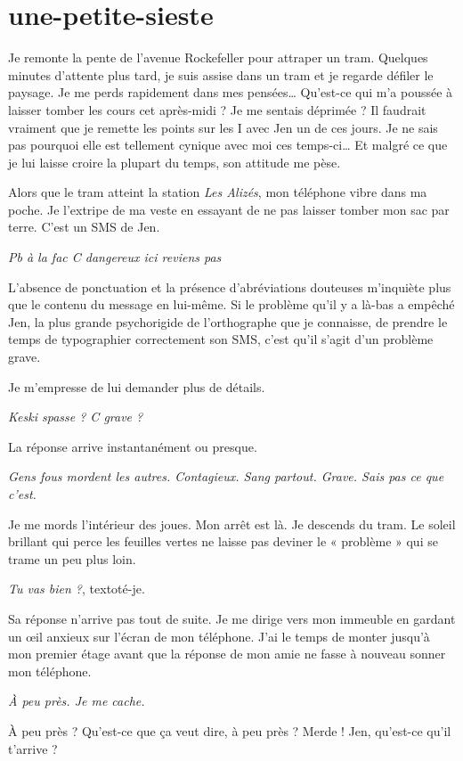 \section{une-petite-sieste}

Je remonte la pente de l'avenue Rockefeller pour attraper un tram. Quelques minutes d'attente plus tard, je suis assise dans un tram et je regarde défiler le paysage. Je me perds rapidement dans mes pensées… Qu'est-ce qui m'a poussée à laisser tomber les cours cet après-midi ? Je me sentais déprimée ? Il faudrait vraiment que je remette les points sur les I avec Jen un de ces jours. Je ne sais pas pourquoi elle est tellement cynique avec moi ces temps-ci… Et malgré ce que je lui laisse croire la plupart du temps, son attitude me pèse.

Alors que le tram atteint la station \textit{Les Alizés}, mon téléphone vibre dans ma poche. Je l'extripe de ma veste en essayant de ne pas laisser tomber mon sac par terre. C'est un SMS de Jen.

\textit{Pb à la fac C dangereux ici reviens pas}

L'absence de ponctuation et la présence d'abréviations douteuses m'inquiète plus que le contenu du message en lui-même. Si le problème qu'il y a là-bas a empêché Jen, la plus grande psychorigide de l'orthographe que je connaisse, de prendre le temps de typographier correctement son SMS, c'est qu'il s'agit d'un problème grave.

Je m'empresse de lui demander plus de détails.

\textit{Keski spasse ? C grave ?}

La réponse arrive instantanément ou presque.

\textit{Gens fous mordent les autres. Contagieux. Sang partout. Grave. Sais pas ce que c'est.}

Je me mords l'intérieur des joues. Mon arrêt est là. Je descends du tram. Le soleil brillant qui perce les feuilles vertes ne laisse pas deviner le « problème » qui se trame un peu plus loin.

\textit{Tu vas bien ?}, textoté-je.

Sa réponse n'arrive pas tout de suite. Je me dirige vers mon immeuble en gardant un œil anxieux sur l'écran de mon téléphone. J'ai le temps de monter jusqu'à mon premier étage avant que la réponse de mon amie ne fasse à nouveau sonner mon téléphone.

\textit{À peu près. Je me cache.}

À peu près ? Qu'est-ce que ça veut dire, à peu près ? Merde ! Jen, qu'est-ce qu'il t'arrive ?

